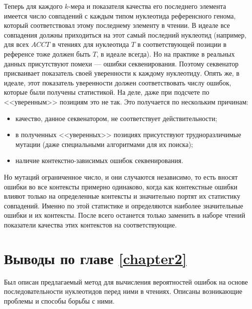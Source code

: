 Теперь для каждого $k$-мера и показателя качества его последнего элемента имеется число совпадений с каждым типом нуклеотида референсного генома, который соответствовал этому последнему элементу в чтении. В идеале все совпадения должны приходиться на этот самый последний нуклеотид (например, для всех $ACCT$ в чтениях для нуклеотида $T$ в соответствующей позиции в референсе тоже должен быть $T$, в идеале всегда). Но на практике в реальных данных присутствуют помехи --- ошибки секвенирования. Поэтому секвенатор присваивает показатель своей уверенности к каждому нуклеотиду. Опять же, в идеале, этот показатель уверенности должен соответствовать числу ошибок, которые были получены статистикой. На деле, даже при подсчете по <<уверенным>> позициям это не так. Это получается по нескольким причинам: 
\begin{itemize}
	\item качество, данное секвенатором, не соответствует действительности;
	\item в полученных <<уверенных>> позициях присутствуют трудноразличимые мутации (даже специальными алгоритмами для их поиска);
	\item наличие контекстно-зависимых ошибок секвенирования.
\end{itemize}
Но мутаций ограниченное число, и они случаются независимо, то есть вносят ошибки во все контексты примерно одинаково, когда как контекстные ошибки влияют только на определенные контексты и значительно портят их статистику совпадений. Именно по этой статистике и определяются наиболее значительные ошибки и их контексты. После всего останется только заменить в наборе чтений показатели качества этих контекстов на соответствующие.

\section{Выводы по главе \protect\ref{chapter2}}

Был описан предлагаемый метод для вычисления вероятностей ошибок на основе последовательности нуклеотидов перед ними в чтениях. Описаны возникающие проблемы и способы борьбы с ними.
